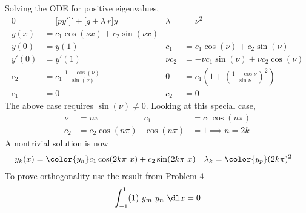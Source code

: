\begin{enumerate}
          Solving the ODE for positive eigenvalues,
          \begin{align}
              0       & = \Big[ py' \Big]' + \Big[ q + \lambda\ r \Big] y     &
              \lambda & = \nu^2                                                 \\
              y(x)    & = c_1 \cos(\nu x) + c_2 \sin(\nu x)                     \\
              y(0)    & = y(1)                                                &
              c_1     & = c_1 \cos(\nu) + c_2 \sin(\nu )                        \\
              y'(0)   & = y'(1)                                               &
              \nu c_2 & = -\nu c_1 \sin(\nu) + \nu c_2 \cos(\nu )               \\
              c_2     & = c_1\ \frac{1 - \cos(\nu)}{\sin(\nu)}                &
              0       & = c_1 \left( 1 + \left( \frac{1 - \cos \nu}{\sin \nu}
              \right)^2 \right)                                                 \\
              c_1     & = 0                                                   &
              c_2     & = 0
          \end{align}
          The above case requires $ \sin(\nu) \neq 0 $. Looking at this special case,
          \begin{align}
              \nu        & = n\pi              &
              c_1        & = c_1 \cos(n\pi)      \\
              c_2        & = c_2 \cos(n\pi)    &
              \cos(n\pi) & = 1 \implies n = 2k
          \end{align}
          A nontrivial solution is now
          \begin{align}
              y_k(x)    & = \color{y_h} c_1 \cos(2k\pi\ x) + c_2 \sin(2k\pi\ x) &
              \lambda_k & = \color{y_p} (2k\pi)^2
          \end{align}
          To prove orthogonality use the result from Problem $ 4 $
          \begin{align}
              \int_{-1}^{1} (1)\ y_m\ y_n\ \dl x = 0
          \end{align}


\end{enumerate}
